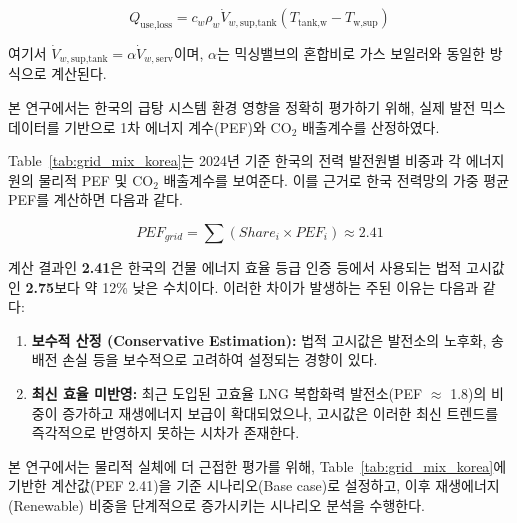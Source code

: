 \documentclass[final,5p,times,twocolumn,authoryear]{elsarticle}
\begin{document}
\begin{equation}
\label{eq:hpb_q_use_loss}
Q_{\text{use,loss}} = c_w \rho_w \dot{V}_{w,\text{sup,tank}} (T_{\text{tank,w}} - T_{\text{w,sup}})
\end{equation}

여기서 $\dot{V}_{w,\text{sup,tank}} = \alpha \dot{V}_{w,\text{serv}}$이며, $\alpha$는 믹싱밸브의 혼합비로 가스 보일러와 동일한 방식으로 계산된다.





본 연구에서는 한국의 급탕 시스템 환경 영향을 정확히 평가하기 위해, 실제 발전 믹스 데이터를 기반으로 1차 에너지 계수(PEF)와 CO$_2$ 배출계수를 산정하였다.

Table~\ref{tab:grid_mix_korea}는 2024년 기준 한국의 전력 발전원별 비중과 각 에너지원의 물리적 PEF 및 CO$_2$ 배출계수를 보여준다. 이를 근거로 한국 전력망의 가중 평균 PEF를 계산하면 다음과 같다.

\begin{equation}
PEF_{grid} = \sum (Share_i \times PEF_i) \approx 2.41
\end{equation}

계산 결과인 \textbf{2.41}은 한국의 건물 에너지 효율 등급 인증 등에서 사용되는 법적 고시값인 \textbf{2.75}보다 약 12\% 낮은 수치이다. 이러한 차이가 발생하는 주된 이유는 다음과 같다:
\begin{enumerate}
    \item \textbf{보수적 산정 (Conservative Estimation):} 법적 고시값은 발전소의 노후화, 송배전 손실 등을 보수적으로 고려하여 설정되는 경향이 있다.
    \item \textbf{최신 효율 미반영:} 최근 도입된 고효율 LNG 복합화력 발전소(PEF $\approx$ 1.8)의 비중이 증가하고 재생에너지 보급이 확대되었으나, 고시값은 이러한 최신 트렌드를 즉각적으로 반영하지 못하는 시차가 존재한다.
\end{enumerate}

본 연구에서는 물리적 실체에 더 근접한 평가를 위해, Table~\ref{tab:grid_mix_korea}에 기반한 계산값(PEF 2.41)을 기준 시나리오(Base case)로 설정하고, 이후 재생에너지(Renewable) 비중을 단계적으로 증가시키는 시나리오 분석을 수행한다.
\end{document}
